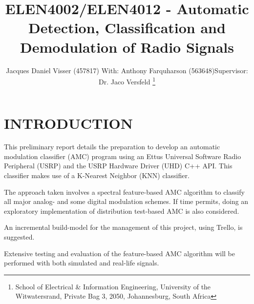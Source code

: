 \documentclass[10pt,twocolumn]{witseiepaper}
\begin{document}
\title{ELEN4002/ELEN4012 - Automatic Detection, Classification and Demodulation of Radio Signals}

\author{Jacques Daniel Visser (457817) \textnormal{\newline With: Anthony Farquharson (563648)\newline Supervisor: Dr. Jaco Versfeld}
\thanks{School of Electrical \& Information Engineering, University of the
Witwatersrand, Private Bag 3, 2050, Johannesburg, South Africa}
}



\maketitle
\thispagestyle{empty}\pagestyle{empty}

\section{INTRODUCTION}
This preliminary report details the preparation to develop an automatic modulation classifier (AMC) program using an Ettus Universal Software Radio Peripheral (USRP) and the USRP Hardware Driver (UHD) C++ API. This classifier makes use of a K-Nearest Neighbor (KNN) classifier.

The approach taken involves a spectral feature-based AMC algorithm to classify all major analog- and some digital modulation schemes. If time permits, doing an exploratory implementation of distribution test-based AMC is also considered.

An incremental build-model for the management of this project, using Trello, is suggested.

Extensive testing and evaluation of the feature-based AMC algorithm will be performed with both simulated and real-life signals.
\end{document}
